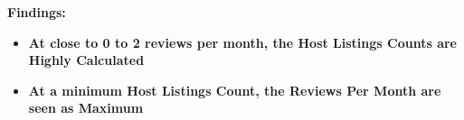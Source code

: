\documentclass[11pt]{article}
\providecommand{\tightlist}{%
      \setlength{\itemsep}{0pt}\setlength{\parskip}{0pt}}
\begin{document}
    \textbf{Findings:}

\begin{itemize}
\tightlist
\item
  \textbf{At close to 0 to 2 reviews per month, the Host Listings Counts
  are Highly Calculated}
\item
  \textbf{At a minimum Host Listings Count, the Reviews Per Month are
  seen as Maximum}
\end{itemize}


    
    
    
\end{document}
